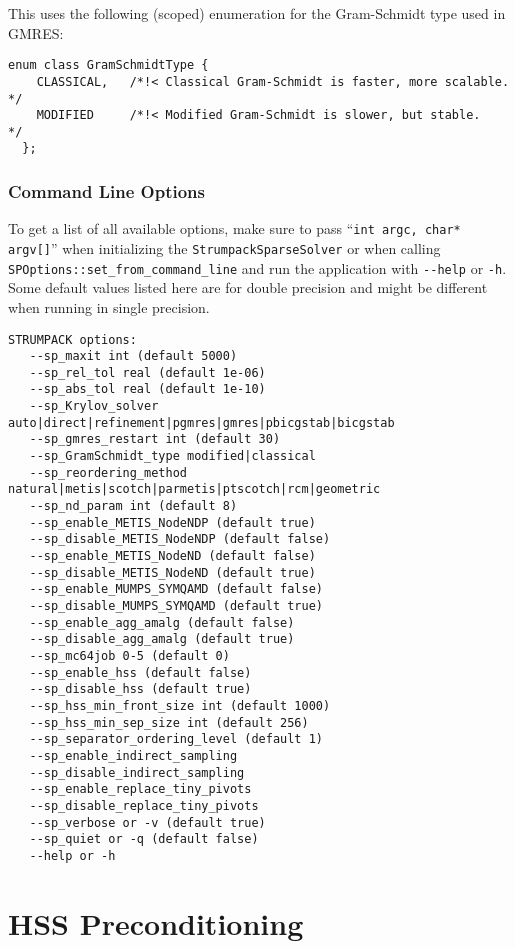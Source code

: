 \documentclass{article}
\begin{document}
This uses the following (scoped) enumeration for the Gram-Schmidt type
used in GMRES:
\begin{lstlisting}[style=C]
  enum class GramSchmidtType {
    CLASSICAL,   /*!< Classical Gram-Schmidt is faster, more scalable.   */
    MODIFIED     /*!< Modified Gram-Schmidt is slower, but stable.       */
  };
\end{lstlisting}

\subsubsection{Command Line Options}
To get a list of all available options, make sure to pass
``\lstinline[style=C]!int argc, char* argv[]!'' when initializing the
\lstinline[style=C]!StrumpackSparseSolver! or when calling
\lstinline[style=C]!SPOptions::set_from_command_line! and run the
application with \lstinline[style=Bash]!--help! or
\lstinline[style=Bash]!-h!. Some default values listed here are for
double precision and might be different when running in single
precision.
\begin{lstlisting}[style=Bash]
 STRUMPACK options:
   --sp_maxit int (default 5000)
   --sp_rel_tol real (default 1e-06)
   --sp_abs_tol real (default 1e-10)
   --sp_Krylov_solver auto|direct|refinement|pgmres|gmres|pbicgstab|bicgstab
   --sp_gmres_restart int (default 30)
   --sp_GramSchmidt_type modified|classical
   --sp_reordering_method natural|metis|scotch|parmetis|ptscotch|rcm|geometric
   --sp_nd_param int (default 8)
   --sp_enable_METIS_NodeNDP (default true)
   --sp_disable_METIS_NodeNDP (default false)
   --sp_enable_METIS_NodeND (default false)
   --sp_disable_METIS_NodeND (default true)
   --sp_enable_MUMPS_SYMQAMD (default false)
   --sp_disable_MUMPS_SYMQAMD (default true)
   --sp_enable_agg_amalg (default false)
   --sp_disable_agg_amalg (default true)
   --sp_mc64job 0-5 (default 0)
   --sp_enable_hss (default false)
   --sp_disable_hss (default true)
   --sp_hss_min_front_size int (default 1000)
   --sp_hss_min_sep_size int (default 256)
   --sp_separator_ordering_level (default 1)
   --sp_enable_indirect_sampling
   --sp_disable_indirect_sampling
   --sp_enable_replace_tiny_pivots
   --sp_disable_replace_tiny_pivots
   --sp_verbose or -v (default true)
   --sp_quiet or -q (default false)
   --help or -h
\end{lstlisting}


\section{HSS Preconditioning}\label{sec:HSS}
\end{document}
